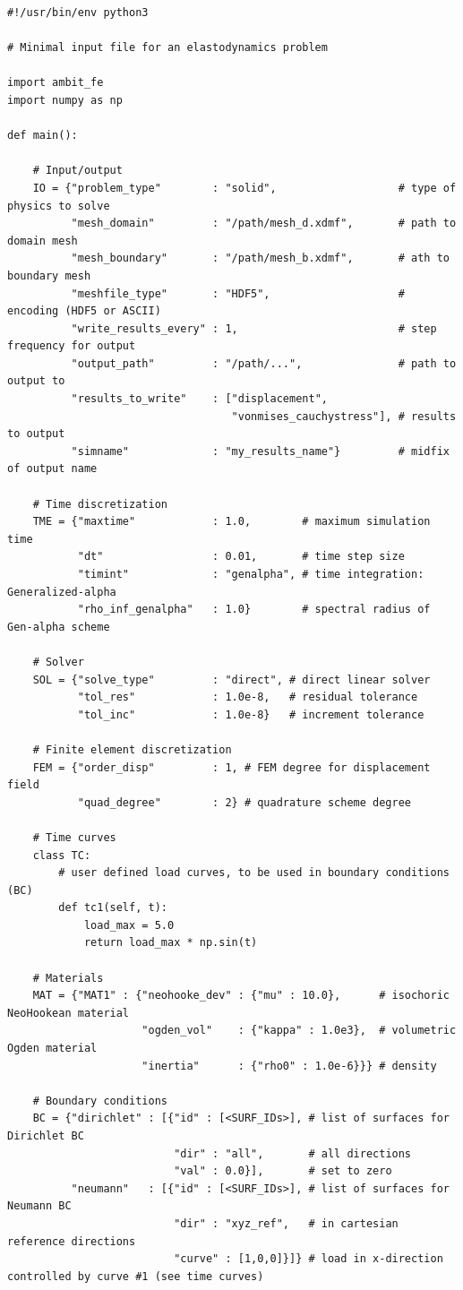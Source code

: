 \documentclass[a4paper,12pt]{report}
\begin{document}
\begin{Verbatim}[breaklines=true]
#!/usr/bin/env python3

# Minimal input file for an elastodynamics problem

import ambit_fe
import numpy as np

def main():

    # Input/output
    IO = {"problem_type"        : "solid",                   # type of physics to solve
          "mesh_domain"         : "/path/mesh_d.xdmf",       # path to domain mesh
          "mesh_boundary"       : "/path/mesh_b.xdmf",       # ath to boundary mesh
          "meshfile_type"       : "HDF5",                    # encoding (HDF5 or ASCII)
          "write_results_every" : 1,                         # step frequency for output
          "output_path"         : "/path/...",               # path to output to
          "results_to_write"    : ["displacement",
                                   "vonmises_cauchystress"], # results to output
          "simname"             : "my_results_name"}         # midfix of output name
    
    # Time discretization  
    TME = {"maxtime"            : 1.0,        # maximum simulation time
           "dt"                 : 0.01,       # time step size
           "timint"             : "genalpha", # time integration: Generalized-alpha
           "rho_inf_genalpha"   : 1.0}        # spectral radius of Gen-alpha scheme
    
    # Solver
    SOL = {"solve_type"         : "direct", # direct linear solver
           "tol_res"            : 1.0e-8,   # residual tolerance
           "tol_inc"            : 1.0e-8}   # increment tolerance
    
    # Finite element discretization
    FEM = {"order_disp"         : 1, # FEM degree for displacement field
           "quad_degree"        : 2} # quadrature scheme degree
    
    # Time curves
    class TC:
        # user defined load curves, to be used in boundary conditions (BC)
        def tc1(self, t):
            load_max = 5.0
            return load_max * np.sin(t)

    # Materials
    MAT = {"MAT1" : {"neohooke_dev" : {"mu" : 10.0},      # isochoric NeoHookean material
                     "ogden_vol"    : {"kappa" : 1.0e3},  # volumetric Ogden material
                     "inertia"      : {"rho0" : 1.0e-6}}} # density

    # Boundary conditions
    BC = {"dirichlet" : [{"id" : [<SURF_IDs>], # list of surfaces for Dirichlet BC
                          "dir" : "all",       # all directions
                          "val" : 0.0}],       # set to zero
          "neumann"   : [{"id" : [<SURF_IDs>], # list of surfaces for Neumann BC
                          "dir" : "xyz_ref",   # in cartesian reference directions
                          "curve" : [1,0,0]}]} # load in x-direction controlled by curve #1 (see time curves)


\end{Verbatim}
\end{document}
